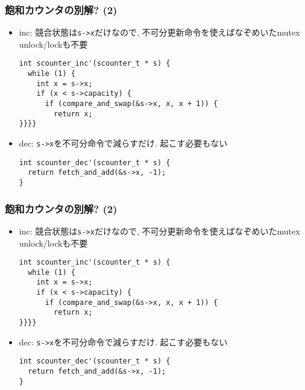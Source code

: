 \documentclass[12pt,dvipdfmx]{beamer}
\begin{document}
\begin{frame}[fragile]
  \frametitle{飽和カウンタの別解? (2)}
  \begin{itemize}
  \item inc: 競合状態は{\tt s->x}だけなので,
    不可分更新命令を使えばなぞめいたmutex unlock/lockも不要
\begin{lstlisting}
int scounter_inc'(scounter_t * s) {
  while (1) {
    int x = s->x;
    if (x < s->capacity) {
      if (compare_and_swap(&s->x, x, x + 1)) {
        return x;
}}}}
\end{lstlisting}

\item dec: {\tt s->x}を不可分命令で減らすだけ. 起こす必要もない
\begin{lstlisting}
int scounter_dec'(scounter_t * s) {
  return fetch_and_add(&s->x, -1);
}
\end{lstlisting}
\end{itemize}
\end{frame}

\begin{frame}[fragile]
  \frametitle{飽和カウンタの別解? (2)}
  \begin{itemize}
  \item inc: 競合状態は{\tt s->x}だけなので,
    不可分更新命令を使えばなぞめいたmutex unlock/lockも不要
\begin{lstlisting}
int scounter_inc'(scounter_t * s) {
  while (1) {
    int x = s->x;
    if (x < s->capacity) {
      if (compare_and_swap(&s->x, x, x + 1)) {
        return x;
}}}}
\end{lstlisting}

\item dec: {\tt s->x}を不可分命令で減らすだけ. 起こす必要もない
\begin{lstlisting}
int scounter_dec'(scounter_t * s) {
  return fetch_and_add(&s->x, -1);
}
\end{lstlisting}
\end{itemize}
\end{frame}
\end{document}
